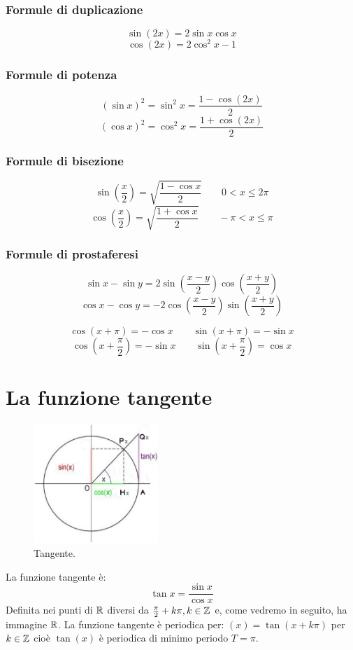 \subsubsection{Formule di duplicazione}
\[\sin(2x)=2\sin x\cos x\]
\[\cos(2x)=2\cos^2 x - 1\]
\subsubsection{Formule di potenza}
\[(\sin x)^2 = \sin^2 x= \frac{1-\cos(2x)}{2}\]
\[(\cos x)^2 = \cos^2 x= \frac{1+\cos(2x)}{2}\]
\subsubsection{Formule di bisezione}
\[\sin(\frac{x}{2})=\sqrt{\frac{1-\cos x}{2}} \qquad 0<x\leq 2\pi\]
\[\cos(\frac{x}{2})=\sqrt{\frac{1+\cos x}{2}} \qquad -\pi<x\leq \pi\]
\subsubsection{Formule di prostaferesi}
\[\sin x -\sin y=2\sin(\frac{x-y}{2})\cos(\frac{x+y}{2})\]
\[\cos x -\cos y=-2\cos(\frac{x-y}{2})\sin(\frac{x+y}{2})\]


\[\cos(x+\pi)=-\cos x \qquad \sin(x+\pi)=-\sin x\]
\[\cos(x+\frac{\pi}{2})=-\sin x \qquad \sin(x+\frac{\pi}{2})=\cos x \]

\section{La funzione tangente}
\begin{figure}
  \begin{center}
    \includegraphics[width=0.42\textwidth]{gfx/4/tangente.png}
  \end{center}
  \caption{Tangente.}\label{fig:circo-tangente}
\end{figure}

La funzione tangente è:
\[\tan x = \frac{\sin x}{\cos x}\]
Definita nei punti di $\mathbb{R}$ diversi da $\frac{\pi}{2} +k\pi,k\in\mathbb{Z}$ e, come vedremo in seguito, ha immagine $\mathbb{R}$.
La funzione tangente è periodica per: $(x)=\tan(x+k\pi)$ per $k\in \mathbb{Z}$ cioè $\tan(x)$ è periodica di minimo periodo $T=\pi$.

